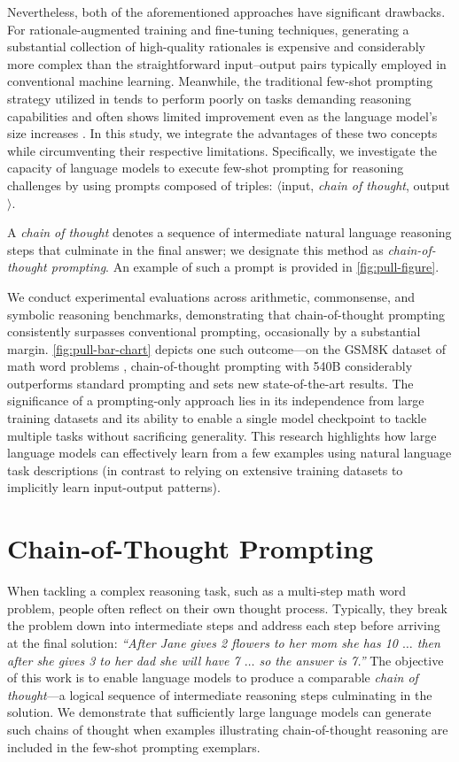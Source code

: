 Nevertheless, both of the aforementioned approaches have significant drawbacks. For rationale-augmented training and fine-tuning techniques, generating a substantial collection of high-quality rationales is expensive and considerably more complex than the straightforward input--output pairs typically employed in conventional machine learning. Meanwhile, the traditional few-shot prompting strategy utilized in \citet{brown2020language} tends to perform poorly on tasks demanding reasoning capabilities and often shows limited improvement even as the language model's size increases \citep{rae2021scaling}. In this study, we integrate the advantages of these two concepts while circumventing their respective limitations. Specifically, we investigate the capacity of language models to execute few-shot prompting for reasoning challenges by using prompts composed of triples: $\langle$input, \emph{chain of thought}, output$\rangle$.

A \emph{chain of thought} denotes a sequence of intermediate natural language reasoning steps that culminate in the final answer; we designate this method as \textit{chain-of-thought prompting}. An example of such a prompt is provided in \cref{fig:pull-figure}.

We conduct experimental evaluations across arithmetic, commonsense, and symbolic reasoning benchmarks, demonstrating that chain-of-thought prompting consistently surpasses conventional prompting, occasionally by a substantial margin. \cref{fig:pull-bar-chart} depicts one such outcome—on the GSM8K dataset of math word problems \citep{cobbe2021training}, chain-of-thought prompting with \palm{} 540B considerably outperforms standard prompting and sets new state-of-the-art results. The significance of a prompting-only approach lies in its independence from large training datasets and its ability to enable a single model checkpoint to tackle multiple tasks without sacrificing generality. This research highlights how large language models can effectively learn from a few examples using natural language task descriptions (in contrast to relying on extensive training datasets to implicitly learn input-output patterns).

\section{Chain-of-Thought Prompting} When tackling a complex reasoning task, such as a multi-step math word problem, people often reflect on their own thought process. Typically, they break the problem down into intermediate steps and address each step before arriving at the final solution: \textit{``After Jane gives 2 flowers to her mom she has 10 $\ldots$ then after she gives 3 to her dad she will have 7 $\ldots$ so the answer is 7.''} The objective of this work is to enable language models to produce a comparable \textit{chain of thought}—a logical sequence of intermediate reasoning steps culminating in the solution. We demonstrate that sufficiently large language models can generate such chains of thought when examples illustrating chain-of-thought reasoning are included in the few-shot prompting exemplars.

